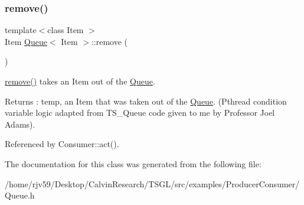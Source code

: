 \subsubsection{\texorpdfstring{remove()}{remove()}}
{\footnotesize\ttfamily template$<$class Item $>$ \\
Item \hyperlink{class_queue}{Queue}$<$ Item $>$\+::remove (\begin{DoxyParamCaption}{ }\end{DoxyParamCaption})}

\hyperlink{class_queue_a5ebe3e112ee1abf233f113ed41e4df29}{remove()} takes an Item out of the \hyperlink{class_queue}{Queue}. \begin{DoxyReturn}{Returns}
\+: temp, an Item that was taken out of the \hyperlink{class_queue}{Queue}. (Pthread condition variable logic adapted from T\+S\+\_\+\+Queue code given to me by Professor Joel Adams). 
\end{DoxyReturn}


Referenced by Consumer\+::act().



The documentation for this class was generated from the following file\+:\begin{DoxyCompactItemize}
\item 
/home/rjv59/\+Desktop/\+Calvin\+Research/\+T\+S\+G\+L/src/examples/\+Producer\+Consumer/Queue.\+h\end{DoxyCompactItemize}
